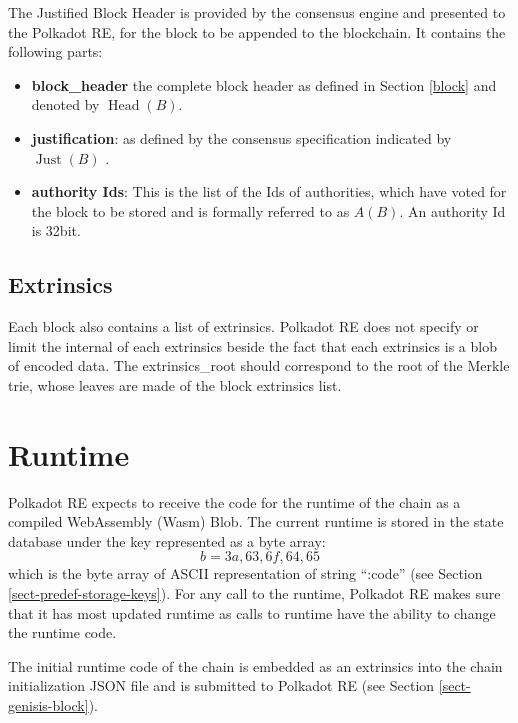 \documentclass{article}
\newcommand{\tmop}[1]{\ensuremath{\operatorname{#1}}}
\newcommand{\tmsamp}[1]{\textsf{#1}}
\newcommand{\tmstrong}[1]{\textbf{#1}}
\newcommand{\tmtextbf}[1]{{\bfseries{#1}}}
\newcommand{\tmtextsf}[1]{{\sffamily{#1}}}
\providecommand{\tmop}[1]{\ensuremath{\mathrm{#1}}}
\providecommand{\tmsamp}[1]{\tmtextsf{#1}}
\providecommand{\tmstrong}[1]{\tmtextbf{#1}}
\providecommand{\tmtextbf}[1]{\tmtextbf{#1}}
\begin{document}
The Justified Block Header is provided by the consensus engine and presented
to the Polkadot RE, for the block to be appended to the blockchain. It
contains the following parts:
\begin{itemize}
  \item {\tmstrong{{\tmsamp{{\tmstrong{block\_header}}}}}} the complete block
  header as defined in Section \ref{block} and denoted by $\tmop{Head} (B)$.
  
  \item {\tmstrong{{\tmsamp{justification}}}}: as defined by the consensus
  specification indicated by $\tmop{Just} (B)$ {}.
  
  \item {\tmstrong{{\tmsamp{authority Ids}}}}: This is the list of the Ids of
  authorities, which have voted for the block to be stored and is formally
  referred to as $A (B)$. An authority Id is 32bit.
\end{itemize}

\subsection{Extrinsics}

Each block also contains a list of extrinsics. Polkadot RE does not specify or
limit the internal of each extrinsics beside the fact that each extrinsics is
a blob of encoded data. The {\tmsamp{extrinsics\_root}} should correspond to
the root of the Merkle trie, whose leaves are made of the block extrinsics
list.

\section{Runtime}\label{sect-entries-into-runtime}

Polkadot RE expects to receive the code for the runtime of the chain as a
compiled WebAssembly (Wasm) Blob. The current runtime is stored in the state
database under the key represented as a byte array:
\[ b = 3 a, 63, 6 f, 64, 65 \]
which is the byte array of ASCII representation of string ``:code'' (see
Section \ref{sect-predef-storage-keys}). For any call to the runtime, Polkadot
RE makes sure that it has most updated runtime as calls to runtime have the
ability to change the runtime code.

The initial runtime code of the chain is embedded as an extrinsics into the
chain initialization JSON file and is submitted to Polkadot RE (see Section
\ref{sect-genisis-block}).
\end{document}
